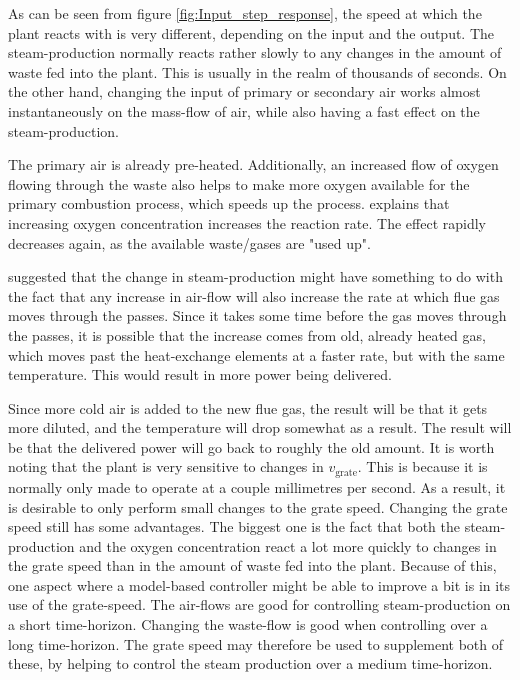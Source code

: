 \noindent
As can be seen from figure \ref{fig:Input_step_response}, the speed at which the plant reacts with is very different, depending on the input and the output. The steam-production normally reacts rather slowly to any changes in the amount of waste fed into the plant. This is usually in the realm of thousands of seconds. On the other hand, changing the input of primary or secondary air works almost instantaneously on the mass-flow of air, while also having a fast effect on the steam-production. 

\noindent
The primary air is already pre-heated. Additionally, an increased flow of oxygen flowing through the waste also helps to make more oxygen available for the primary combustion process, which speeds up the process. \cite{Elisa_source} explains that increasing oxygen concentration increases the reaction rate. The effect rapidly decreases again, as the available waste/gases are "used up". 
\noindent

\cite{summer_student} suggested that the change in steam-production might have something to do with the fact that any increase in air-flow will also increase the rate at which flue gas moves through the passes. Since it takes some time before the gas moves through the passes, it is possible that the increase comes from old, already heated gas, which moves past the heat-exchange elements at a faster rate, but with the same temperature. This would result in more power being delivered. 

Since more cold air is added to the new flue gas, the result will be that it gets more diluted, and the temperature will drop somewhat as a result. The result will be that the delivered power will go back to roughly the old amount. 
\noindent
It is worth noting that the plant is very sensitive to changes in $v_{\text{grate}}$. This is because it is normally only made to operate at a couple millimetres per second. As a result, it is desirable to only perform small changes to the grate speed. Changing the grate speed still has some advantages. The biggest one is the fact that both the steam-production and the oxygen concentration react a lot more quickly to changes in the grate speed than in the amount of waste fed into the plant. Because of this, one aspect where a model-based controller might be able to improve a bit is in its use of the grate-speed. The air-flows are good for controlling steam-production on a short time-horizon. Changing the waste-flow is good when controlling over a long time-horizon. The grate speed may therefore be used to supplement both of these, by helping to control the steam production over a medium time-horizon. 
\noindent

